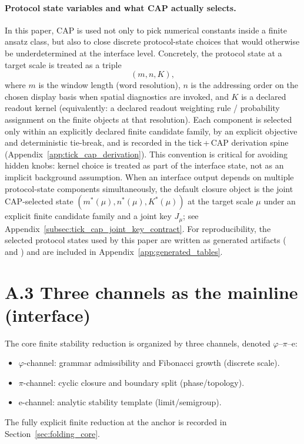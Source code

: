\paragraph{Protocol state variables and what CAP actually selects.}
\InterfaceTag In this paper, CAP is used not only to pick numerical constants inside a finite ansatz class, but also to close discrete protocol-state choices that would otherwise be underdetermined at the interface level.
Concretely, the protocol state at a target scale is treated as a triple
\[
(m,n,K),
\]
where $m$ is the window length (word resolution), $n$ is the addressing order on the chosen display basis when spatial diagnostics are invoked, and $K$ is a declared readout kernel (equivalently: a declared readout weighting rule / probability assignment on the finite objects at that resolution).
\AuditTag Each component is selected only within an explicitly declared finite candidate family, by an explicit objective and deterministic tie-break, and is recorded in the tick\,+\,CAP derivation spine (Appendix~\ref{app:tick_cap_derivation}).
This convention is critical for avoiding hidden knobs: kernel choice is treated as part of the interface state, not as an implicit background assumption.
\AuditTag When an interface output depends on multiple protocol-state components simultaneously, the default closure object is the joint CAP-selected state $(m^\ast(\mu),n^\ast(\mu),K^\ast(\mu))$ at the target scale $\mu$ under an explicit finite candidate family and a joint key $J_\mu$; see Appendix~\ref{subsec:tick_cap_joint_key_contract}.
\AuditTag For reproducibility, the selected protocol states used by this paper are written as generated artifacts ( and ) and are included in Appendix~\ref{app:generated_tables}.

\section*{A.3 Three channels as the mainline (interface)}

\InterfaceTag The core finite stability reduction is organized by three channels, denoted $\varphi$--$\pi$--$\mathrm{e}$:
\begin{itemize}
    \item $\varphi$-channel: grammar admissibility and Fibonacci growth (discrete scale).
    \item $\pi$-channel: cyclic closure and boundary split (phase/topology).
    \item $\mathrm{e}$-channel: analytic stability template (limit/semigroup).
\end{itemize}
The fully explicit finite reduction at the anchor is recorded in Section~\ref{sec:folding_core}.


